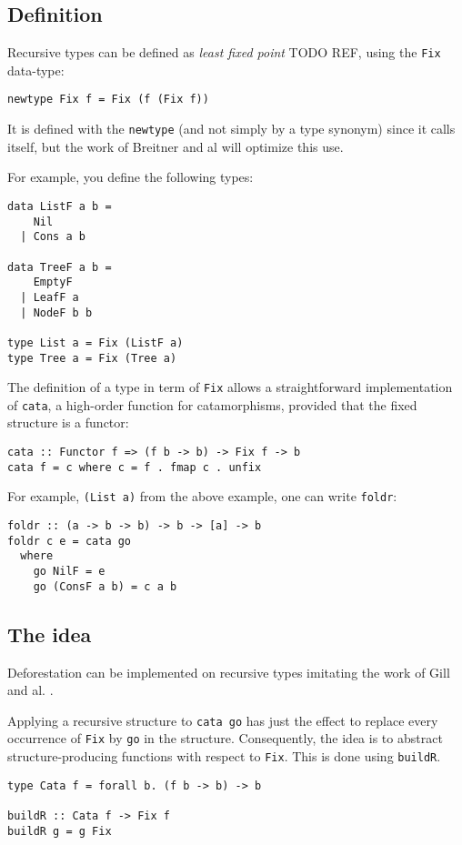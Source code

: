 \documentclass[format=sigplan]{acmart}
\newcommand{\minline}[1]{\texttt{#1}}
\begin{document}
\subsection{Definition}
\label{sec:defi}
Recursive types can be defined as \emph{least fixed point} TODO REF, using the \minline{Fix} data-type:
\begin{verbatim}
newtype Fix f = Fix (f (Fix f))
\end{verbatim}
It is defined with the \minline{newtype} (and not simply by a type synonym) since it calls itself, but the work of Breitner and al \cite{Breitner:2014:SZC:2692915.2628141} will optimize this use.

For example, you define the following types:
\begin{verbatim}
data ListF a b =
    Nil
  | Cons a b
  
data TreeF a b =
    EmptyF
  | LeafF a
  | NodeF b b
  
type List a = Fix (ListF a)
type Tree a = Fix (Tree a)
\end{verbatim}

The definition of a type in term of \minline{Fix} allows a straightforward implementation of \minline{cata}, a high-order function for catamorphisms, provided that the fixed structure is a functor:
\begin{verbatim}
cata :: Functor f => (f b -> b) -> Fix f -> b
cata f = c where c = f . fmap c . unfix
\end{verbatim}

For example, \minline{(List a)} from the above example, one can write \minline{foldr}:
\begin{verbatim}
foldr :: (a -> b -> b) -> b -> [a] -> b
foldr c e = cata go
  where
    go NilF = e
    go (ConsF a b) = c a b
\end{verbatim}

\subsection{The idea}
Deforestation can be implemented on recursive types imitating the work of Gill and al. \cite{Gill:1993:SCD:165180.165214}.

Applying a recursive structure to \minline{cata go} has just the effect to replace every occurrence of \minline{Fix} by \minline{go} in the structure. Consequently, the idea is to abstract structure-producing functions with respect to \minline{Fix}. This is done using \minline{buildR}.

\begin{verbatim}
type Cata f = forall b. (f b -> b) -> b

buildR :: Cata f -> Fix f
buildR g = g Fix
\end{verbatim}
\end{document}
